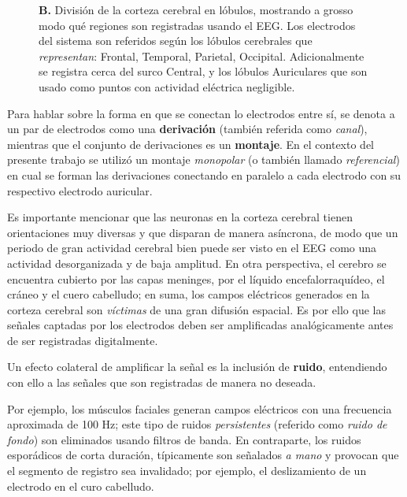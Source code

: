 \documentclass[12pt,letterpaper]{book}
\newcommand{\hz}{\si{\hertz}\xspace}
\begin{document}
\begin{figure}
{%
\textbf{B.} División de la corteza cerebral en lóbulos, mostrando a grosso modo qué regiones son registradas usando el EEG. Los electrodos del sistema son referidos según los lóbulos cerebrales que \textit{representan}: Frontal, Temporal, Parietal, Occipital. Adicionalmente se registra cerca del surco Central, y los lóbulos Auriculares que son usado como puntos con actividad eléctrica negligible.
}
\label{img1020}
\end{figure}

Para hablar sobre la forma en que se conectan lo electrodos entre sí, se denota a un par de electrodos como una \textbf{derivación} (también referida como \textit{canal}), mientras que el conjunto de derivaciones es un \textbf{montaje}.
%
En el contexto del presente trabajo se utilizó un montaje \textit{monopolar} (o también llamado \textit{referencial}) en cual se forman las derivaciones conectando en paralelo a cada electrodo con su respectivo electrodo auricular.

Es importante mencionar que las neuronas en la corteza cerebral tienen orientaciones muy diversas y que disparan de manera asíncrona, de modo que un periodo de gran actividad cerebral bien puede ser visto en el EEG como una actividad desorganizada y de baja amplitud.
%
En otra perspectiva, el cerebro se encuentra cubierto por las capas meninges, por el líquido encefalorraquídeo, el cráneo y el cuero cabelludo; en suma, los campos eléctricos generados en la corteza cerebral son \textit{víctimas} de una gran difusión espacial.
%
Es por ello que las señales captadas por los electrodos deben ser amplificadas analógicamente antes de ser registradas digitalmente.

Un efecto colateral de amplificar la señal es la inclusión de \textbf{ruido}, entendiendo con ello a las señales que son registradas de manera no deseada.

Por ejemplo, los músculos faciales generan campos eléctricos con una frecuencia aproximada de 100 \hz; este tipo de ruidos \textit{persistentes} (referido como \textit{ruido de fondo}) son eliminados usando filtros de banda.
%
En contraparte, los ruidos esporádicos de corta duración, típicamente son señalados \textit{a mano} y provocan que el segmento de registro sea invalidado; por ejemplo, el deslizamiento de un electrodo en el curo cabelludo.
\end{document}
